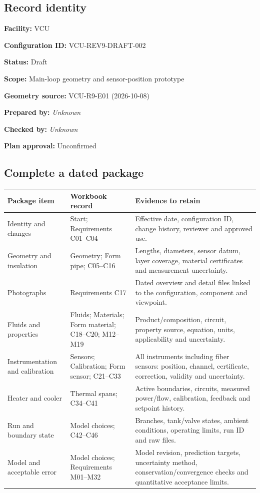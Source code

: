 \documentclass[11pt]{article}
\begin{document}
\subsection*{Record identity}
\textbf{Facility:} VCU\par
\textbf{Configuration ID:} VCU-REV9-DRAFT-002\par
\textbf{Status:} Draft\par
\textbf{Scope:} Main-loop geometry and sensor-position prototype\par
\textbf{Geometry source:} VCU-R9-E01 (2026-10-08)\par
\textbf{Prepared by:} \textit{Unknown}\par
\textbf{Checked by:} \textit{Unknown}\par
\textbf{Plan approval:} Unconfirmed\par
\subsection*{Complete a dated package}
\small\setlength{\tabcolsep}{4pt}
\begin{longtable}{>{\raggedright\arraybackslash}p{}>{\raggedright\arraybackslash}p{}>{\raggedright\arraybackslash}p{}}
\toprule
\textbf{Package item} & \textbf{Workbook record} & \textbf{Evidence to retain} \\\midrule\endhead
Identity and changes & Start; Requirements C01--C04 & Effective date, configuration ID, change history, reviewer and approved use. \\[3pt]
Geometry and insulation & Geometry; Form pipe; C05--C16 & Lengths, diameters, sensor datum, layer coverage, material certificates and measurement uncertainty. \\[3pt]
Photographs & Requirements C17 & Dated overview and detail files linked to the configuration, component and viewpoint. \\[3pt]
Fluids and properties & Fluids; Materials; Form material; C18--C20; M12--M19 & Product/composition, circuit, property source, equation, units, applicability and uncertainty. \\[3pt]
Instrumentation and calibration & Sensors; Calibration; Form sensor; C21--C33 & All instruments including fiber sensors: position, channel, certificate, correction, validity and uncertainty. \\[3pt]
Heater and cooler & Thermal spans; C34--C41 & Active boundaries, circuits, measured power/flow, calibration, feedback and setpoint history. \\[3pt]
Run and boundary state & Model choices; C42--C46 & Branches, tank/valve states, ambient conditions, operating limits, run ID and raw files. \\[3pt]
Model and acceptable error & Model choices; Requirements M01--M32 & Model revision, prediction targets, uncertainty method, conservation/convergence checks and quantitative acceptance limits. \\[3pt]
\bottomrule\end{longtable}\normalsize
\end{document}
